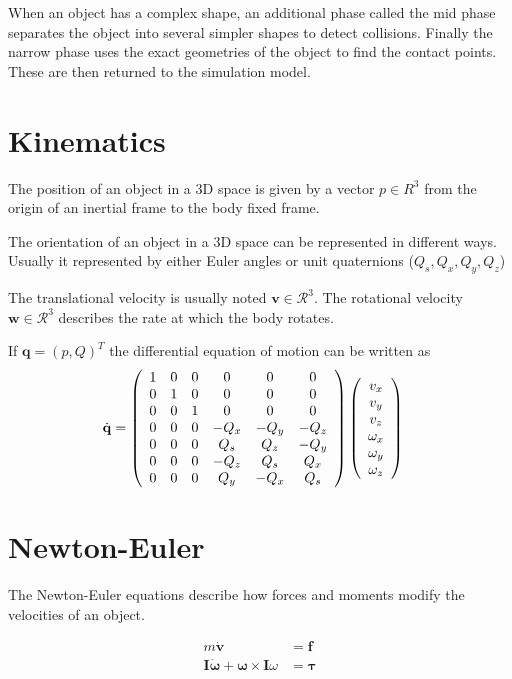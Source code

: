 When an object has a complex shape, an additional phase called the mid phase separates the object into several simpler shapes to detect collisions. Finally the narrow phase uses the exact geometries of the object to find the contact points. These are then returned to the simulation model.


\section{Kinematics}
The position of an object in a 3D space is given by a vector $p \in R^3$ from the origin of an inertial frame to the body fixed frame.

The orientation of an object in a 3D space can be represented in different ways. Usually it represented by either Euler angles or unit quaternions ($Q_s, Q_x, Q_y, Q_z$)

The translational velocity is usually noted $\mathbf{v} \in \mathcal{R}^3$. The rotational velocity $\mathbf{w} \in \mathcal{R}^3$ describes the rate at which the body rotates.

If $\mathbf{q} = (p, Q)^T$ the differential equation of motion can be written as 
\begin{align*}
\dot{\mathbf{q}} &= \left(\begin{array}{c c c c c c}
1 & 0 & 0 & 0 & 0 & 0\\
0 & 1 & 0 & 0 & 0 & 0\\
0 & 0 & 1 & 0 & 0 & 0\\
0 & 0 & 0 & -Q_x & -Q_y & -Q_z\\
0 & 0 & 0 & Q_s & Q_z & -Q_y\\
0 & 0 & 0 & -Q_z & Q_s & Q_x\\
0 & 0 & 0 & Q_y & -Q_x & Q_s
\end{array}\right)
\left(\begin{array}{c}
v_x\\
v_y\\
v_z\\
\omega_x\\
\omega_y\\
\omega_z
\end{array}\right)
\end{align*}

\section{Newton-Euler}
The Newton-Euler equations describe how forces and moments modify the velocities of an object.

\begin{align}
m\dot{\mathbf{v}} &= \mathbf{f}\\
\mathbf{I}\dot{\mathbf{\omega}} + \mathbf{\omega} \times \mathbf{I}\omega &= \mathbf{\tau}
\end{align}

